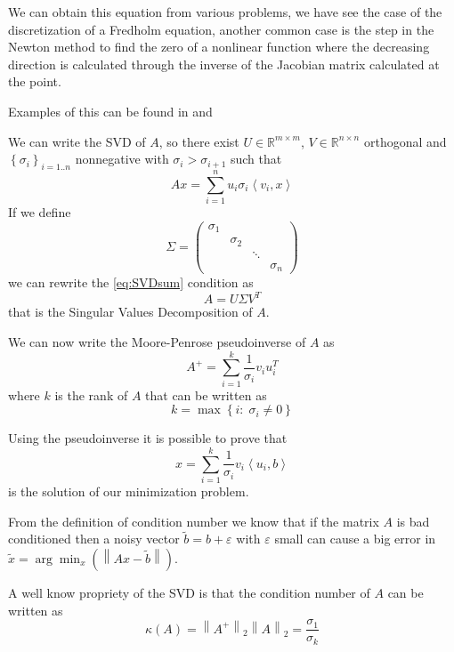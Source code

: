 \documentclass[a4paper,10pt]{article}
\theoremstyle{plain}
\theoremstyle{definition}
\theoremstyle{remark}
\newcommand{\set}[1]{\left\{#1\right\}}
\newcommand{\pa}[1]{\left(#1\right)}
\newcommand{\ang}[1]{\left<#1\right>}
\newcommand{\norm}[1]{\left\|#1\right\|}
\begin{document}
We can obtain this equation from various problems, we have see the
case of the discretization of a Fredholm equation, another common case
is the step in the Newton method to find the zero of a nonlinear
function where the decreasing direction is calculated through the
inverse of the Jacobian matrix calculated at the point.

Examples of this can be found in \cite{inversesturm} and \cite{atmospheric}

We can write the SVD of $A$, so there exist $U\in \mathbb{R}^{m\times
  m}$, $V\in \mathbb{R}^{n\times n}$ orthogonal and $\set{\sigma
  _i}_{i=1..n}$ nonnegative with $\sigma _i > \sigma _{i+1}$ such that
\begin{equation}
  \label{eq:SVDsum}
  Ax = \sum _{i=1} ^n u_i \sigma _i \ang{v_i,x}
\end{equation}
If we define
\[ \Sigma = \begin{pmatrix}
\sigma _1 & & & \\
& \sigma _2 & &  \\
& & \ddots & \\
& & & \sigma _n 
\end{pmatrix} \]
we can rewrite the \ref{eq:SVDsum} condition as
\begin{equation}
  \label{eq:SVDmat}
  A = U\Sigma V^T
\end{equation}
that is the Singular Values Decomposition of $A$.

We can now write the Moore-Penrose pseudoinverse of $A$ as
\begin{equation}
  \label{eq:pseudoinverse}
  A^+ = \sum _{i=1} ^k \frac{1}{\sigma _i} v_i u_i ^T 
\end{equation}
where $k$ is the rank of $A$ that can be written as
\[ k = \max \set{ i :\; \sigma_i \neq 0 } \]

Using the pseudoinverse it is possible to prove that
\begin{equation}
  \label{eq:inverseSVDunreg}
  x = \sum _{i=1} ^k \frac{1}{\sigma _i} v_i \ang{u_i,b}
\end{equation}
is the solution of our minimization problem.

From the definition of condition number we know that if the matrix $A$
is bad conditioned then a noisy vector $\tilde b = b + \varepsilon$
with $\varepsilon$ small can cause a big error in $\tilde x = \arg\min _{x}
\pa{ \norm{ Ax - \tilde b }}$.

A well know propriety of the SVD is that the condition number of $A$
can be written as
\[ \kappa (A) = \norm{A^+}_2\norm{A}_2 = \frac{\sigma _1}{\sigma _k} \]
\end{document}
